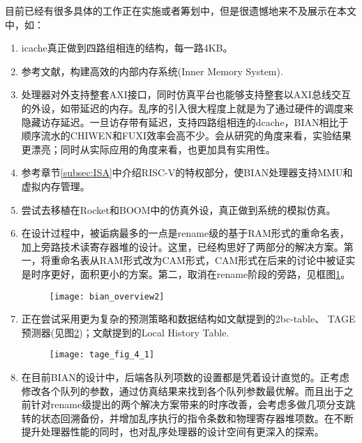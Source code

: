 目前已经有很多具体的工作正在实施或者筹划中，但是很遗憾地来不及展示在本文中，如：
\begin{enumerate}[label=(\arabic*)]
	\item icache真正做到四路组相连的结构，每一路4KB。
	\item 参考文献\citet{Alpha21264,MIPS1996}，构建高效的内部内存系统(Inner Memory System).
	\item 处理器对外支持整套AXI接口，同时仿真平台也能够支持整套以AXI总线交互的外设，如带延迟的内存。乱序的引入很大程度上就是为了通过硬件的调度来隐藏访存延迟。一旦访存带有延迟，支持四路组相连的dcache，BIAN相比于顺序流水的CHIWEN和FUXI效率会高不少。会从研究的角度来看，实验结果更漂亮；同时从实际应用的角度来看，也更加具有实用性。
	\item 参考章节\ref{subsec:ISA}中介绍RISC-V的特权部分，使BIAN处理器支持MMU和虚拟内存管理。
	\item 尝试去移植在Rocket和BOOM中的仿真外设，真正做到系统的模拟仿真。
	\item 在设计过程中，被诟病最多的一点是rename级的基于RAM形式的重命名表，加上旁路技术读寄存器堆的设计。这里，已经构思好了两部分的解决方案。第一，将重命名表从RAM形式改为CAM形式，CAM形式在后来的讨论中被证实是时序更好，面积更小的方案。第二，取消在rename阶段的旁路，见框图\ref{fig:bian_over2}。
	\begin{figure}[!htbp]
		\centering
		\texttt{[image: bian\_overview2]}
		\label{fig:bian_over2}
	\end{figure}
	\item 正在尝试采用更为复杂的预测策略和数据结构如文献\citet{Celio:EECS-2018-151}提到的2bc-table、 TAGE预测器(见图\ref{fig:TAGE})；文献\citet{Alpha21264}提到的Local History Table.
	\begin{figure}[!htbp]
		\centering
		\texttt{[image: tage\_fig\_4\_1]}
		\label{fig:TAGE}
	\end{figure}
	\item 在目前BIAN的设计中，后端各队列项数的设置都是凭着设计直觉的。正考虑修改各个队列的参数，通过仿真结果来找到各个队列参数最优解。而且出于之前针对rename级提出的两个解决方案带来的时序改善，会考虑多做几项分支跳转的状态回溯备份，并增加乱序执行的指令条数和物理寄存器堆项数。在不断提升处理器性能的同时，也对乱序处理器的设计空间有更深入的探索。
\end{enumerate}
	
